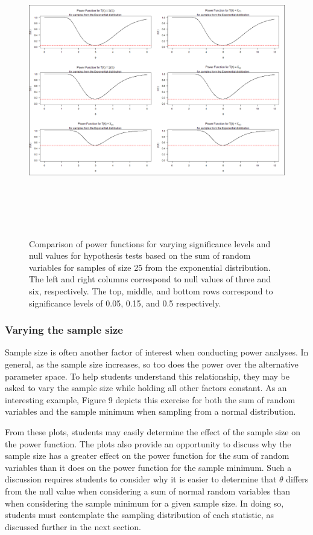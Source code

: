 \documentclass{TISE}
\begin{document}
\begin{figure}[H]
	\centering
	\includegraphics[height=5in, width=\linewidth]{fig8.png}
	\caption{Comparison of power functions for varying significance levels and null values for hypothesis tests based on the sum of random variables for samples of size 25 from the exponential distribution. The left and right columns correspond to null values of three and six, respectively. The top, middle, and bottom rows correspond to significance levels of 0.05, 0.15, and 0.5 respectively.}
\end{figure}

\subsubsection{Varying the sample size}

Sample size is often another factor of interest when conducting power analyses. In general, as the sample size increases, so too does the power over the alternative parameter space. To help students understand this relationship, they may be asked to vary the sample size while holding all other factors constant. As an interesting example, Figure 9 depicts this exercise for both the sum of random variables and the sample minimum when sampling from a normal distribution. 

From these plots, students may easily determine the effect of the sample size on the power function. The plots also provide an opportunity to discuss why the sample size has a greater effect on the power function for the sum of random variables than it does on the power function for the sample minimum. Such a discussion requires students to consider why it is easier to determine that $\theta$ differs from the null value when considering a sum of normal random variables than when considering the sample minimum for a given sample size. In doing so, students must contemplate the sampling distribution of each statistic, as discussed further in the next section.
\end{document}
